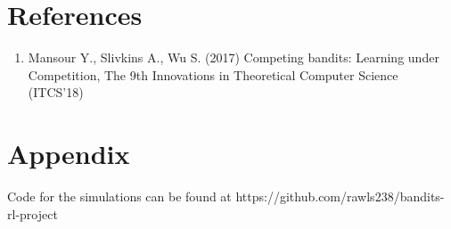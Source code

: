 \documentclass[11pt,letterpaper]{article}
\begin{document}
\section*{References}
\begin{enumerate}
\item Mansour Y., Slivkins A., Wu S. (2017) Competing bandits: Learning under Competition, The 9th Innovations in Theoretical Computer Science (ITCS'18)
\end{enumerate}

\section*{Appendix}

Code for the simulations can be found at https://github.com/rawls238/bandits-rl-project
\end{document}

